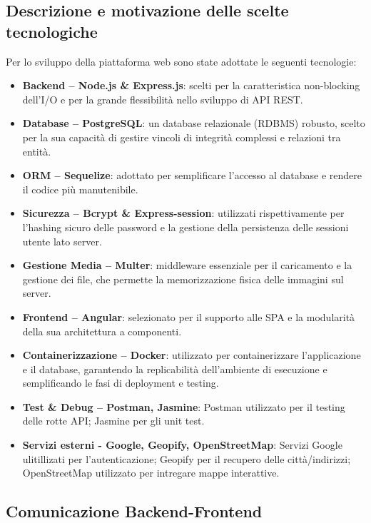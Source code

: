 \documentclass{article}
\begin{document}
\subsection{Descrizione e motivazione delle scelte tecnologiche}
Per lo sviluppo della piattaforma web sono state adottate le seguenti tecnologie:
\begin{itemize}
    \item  \textbf{Backend – Node.js \& Express.js}: scelti per la caratteristica non-blocking dell'I/O e  per la grande flessibilità nello sviluppo di API REST.
    \item \textbf{Database – PostgreSQL}: un database relazionale (RDBMS) robusto, scelto per la sua capacità di gestire vincoli di integrità complessi e relazioni tra entità.
    \item  \textbf{ORM – Sequelize}: adottato per semplificare l’accesso al database e rendere il codice più manutenibile.
    \item \textbf{Sicurezza – Bcrypt \& Express-session}: utilizzati rispettivamente per l'hashing sicuro delle password e la gestione della persistenza delle sessioni utente lato server.
    \item \textbf{Gestione Media – Multer}: middleware essenziale per il caricamento e la gestione dei file, che permette la memorizzazione fisica delle immagini sul server.
    \item \textbf{Frontend – Angular}: selezionato per il supporto alle SPA e la modularità della sua architettura a componenti.
    \item \textbf{Containerizzazione – Docker}: utilizzato per containerizzare l'applicazione e il database, garantendo la replicabilità dell'ambiente di esecuzione e semplificando le fasi di deployment e testing.
    \item \textbf{Test \& Debug – Postman, Jasmine}: Postman utilizzato per il testing delle rotte API; Jasmine per gli unit test.
    \item \textbf{Servizi esterni - Google, Geopify, OpenStreetMap}: Servizi Google ulitillizati per l'autenticazione; Geopify per il recupero delle città/indirizzi; OpenStreetMap utilizzato per intregare mappe interattive.
\end{itemize}

\newpage

\subsection{Comunicazione Backend-Frontend}
\end{document}
